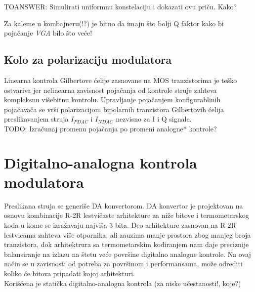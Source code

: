 \documentclass[journal,twocolumn,letterpaper]{IEEEJERM}
\begin{document}
TOANSWER:
Simulirati uniformnu konstelaciju i dokazati ovu priču.
Kako?


Za kaleme u kombajneru(!?) je bitno da imaju što bolji Q faktor kako bi pojačanje \textit{VGA} bilo što veće!


\subsection{Kolo za polarizaciju modulatora}

Linearna kontrola Gilbertove ćelije zasnovane na MOS tranzistorima je teško ostvariva jer nelinearna zavisnost pojačanja od kontrole struje zahteva kompleksnu višebitnu kontrolu. 
Upravljanje pojačanjem konfigurablinih pojačavača se vrši polarizacijom bipolarnih tranzistora Gilbertovih ćelija preslikavanjem struja $I_{PDAC}$ i  $I_{NDAC}$ nezvisno za I i Q signale. \\

TODO: Izračunaj promenu pojačanja po promeni analogne* kontrole?


\section{Digitalno-analogna kontrola modulatora}


Preslikana struja se generiše DA konvertorom. DA konvertor je projektovan na osnovu kombinacije R-2R lestvičaste arhitekture za niže bitove i termometarskog koda u kome se izražavaju najviša 3 bita. Deo arhitekture zasnovan na R-2R lestvicama zahteva više otpornika, ali zauzima manje prostora zbog manjeg broja tranzistora, dok arhitektrura sa termometarskim kodiranjem nam daje preciznije balansiranje na izlazu na štetu veće površine digitalno analogne kontrole. Na ovaj način se u zavisnosti od potreba za površinom i performansama, može odrediti koliko će bitova pripadati kojoj arhitekturi. \\

Korišćena je statička digitalno-analogna kontrola (za niske učestanosti!, koje?)
\end{document}
